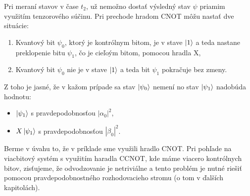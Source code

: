 Pri meraní stavov v čase \(t_2\), už nemožno dostať výsledný stav \(\psi\)
priamim využitím tenzorového súčinu. Pri prechode hradom CNOT môžu nastať
dve situácie:
\begin{enumerate}
    \item Kvantový bit \(\psi_0\), ktorý je kontrólnym bitom, je v stave 
\(\ket{1}\) a teda nastane preklopenie bitu \(\psi_1\), čo je cieľoým bitom,
pomocou hradla X,
    \item Kvantový bit \(\psi_0\) nie je v stave \(\ket{1}\) a teda bit 
\(\psi_1\) pokračuje bez zmeny.
\end{enumerate}

Z toho je jasné, že v kažom prípade sa stav \(\ket{\psi_0}\) nemení no
stav \(\ket{\psi_1}\) nadobúda hodnotu:
\begin{itemize}
    \item \(\ket{\psi_1}\) s pravdepodobnosťou \(|\alpha_0|^2\),
    \item \(X\ket{\psi_1}\) s pravdepodobnosťou \(|\beta_0|^2\).
\end{itemize}
Berme v úvahu to, že v príklade sme využili hradlo CNOT. Pri pohľade na 
viacbitový systém s využitím haradla CCNOT, kde máme viacero kontrólnych bitov,
zisťujeme, že odvodzovanie je netriviálne a tento problém je nutné riešiť
pomocou pravdepodobnostného rozhodovacieho stromu (o tom v ďalších kapitolách).
